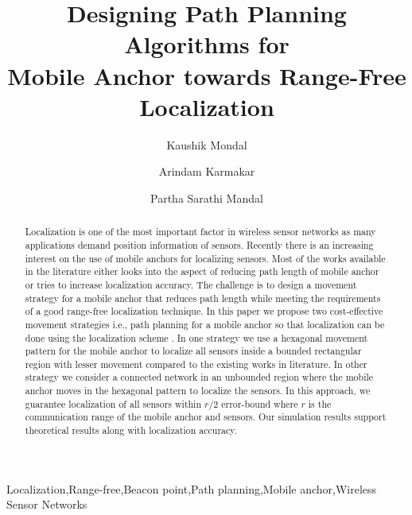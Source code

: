 \documentclass[preprint,11pt]{elsarticle}
\begin{document}
\begin{frontmatter}

\title{Designing Path Planning Algorithms for\\ Mobile Anchor towards Range-Free Localization}
\author[label1]{Kaushik Mondal}
\author[label2]{Arindam Karmakar}
\author[label1]{Partha Sarathi Mandal}
\address[label1]{Indian Institute of Technology Guwahati, India}
\address[label2]{Tezpur University, India}







\begin{abstract}
Localization is one of the most important factor in wireless sensor networks as
many applications demand position information of sensors.
Recently there is an increasing interest on the use of mobile anchors for localizing sensors.
Most of the works available in the literature either looks into the aspect of reducing path
length of mobile anchor or tries to increase localization accuracy.
The challenge is to design a movement strategy for a mobile anchor that reduces path length
while meeting the requirements of a good range-free localization technique.
In this paper we propose two cost-effective movement strategies i.e., path planning for a mobile anchor
so that localization can be done using the localization scheme \cite{Lee2009}.
In one strategy we use a hexagonal movement pattern for the mobile anchor to localize all sensors inside a bounded
rectangular region with lesser movement compared to the existing works in literature.
In other strategy we consider a connected network in an unbounded region where the mobile anchor
moves in the hexagonal pattern to localize the sensors. In this approach, we guarantee localization of
all sensors within $r/2$ error-bound where $r$ is the communication range of the mobile anchor and sensors.
Our simulation results support theoretical results along with localization accuracy.
\end{abstract}

\begin{keyword}
Localization\sep Range-free\sep Beacon point\sep Path planning\sep Mobile anchor\sep Wireless Sensor Networks
\end{keyword}

\end{frontmatter}
\end{document}

